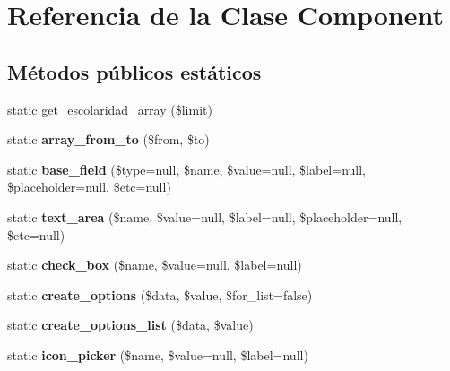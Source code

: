 \hypertarget{class_component}{}\section{Referencia de la Clase Component}
\label{class_component}
\subsection*{Métodos públicos estáticos}
\begin{DoxyCompactItemize}
\item 
static \mbox{\hyperlink{class_component_ae064083382c242e7e97acc9295e594a1}{get\+\_\+escolaridad\+\_\+array}} (\$limit)
\item 
\mbox{\label{class_component_a04038f1b63585dd71fd8fdef85a256a7}} 
static {\bfseries array\+\_\+from\+\_\+to} (\$from, \$to)
\item 
\mbox{\label{class_component_a0e884acdb875c9d620824803a8869460}} 
static {\bfseries base\+\_\+field} (\$type=null, \$name, \$value=null, \$label=null, \$placeholder=null, \$etc=null)
\item 
\mbox{\label{class_component_a488b5031d9bad142450137f9af35904e}} 
static {\bfseries text\+\_\+area} (\$name, \$value=null, \$label=null, \$placeholder=null, \$etc=null)
\item 
\mbox{\label{class_component_a1477baf3a7b3ceb91fd6f564377567d3}} 
static {\bfseries check\+\_\+box} (\$name, \$value=null, \$label=null)
\item 
\mbox{\label{class_component_ae302d074089b7f240b44ee69a7712dce}} 
static {\bfseries create\+\_\+options} (\$data, \$value, \$for\+\_\+list=false)
\item 
\mbox{\label{class_component_a3212ab8134d408df71f56bd97e646832}} 
static {\bfseries create\+\_\+options\+\_\+list} (\$data, \$value)
\item 
\mbox{\label{class_component_a0bc19dbd792364b2f5661fa554e1e1e0}} 
static {\bfseries icon\+\_\+picker} (\$name, \$value=null, \$label=null)
\item 
\mbox{\label{class_component_a093db9051cb1610137758302727e494a}} 

\end{DoxyCompactItemize}
